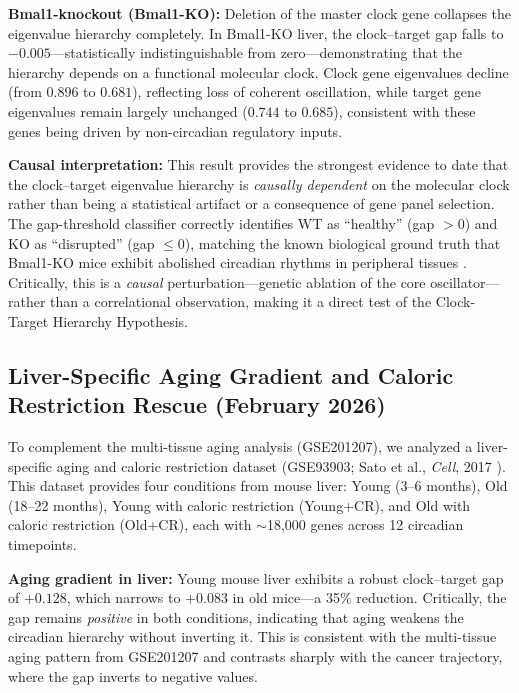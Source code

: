 \documentclass[11pt,a4paper]{article}
\begin{document}
\textbf{Bmal1-knockout (Bmal1-KO):} Deletion of the master clock gene collapses the eigenvalue hierarchy completely. In Bmal1-KO liver, the clock--target gap falls to $-0.005$---statistically indistinguishable from zero---demonstrating that the hierarchy depends on a functional molecular clock. Clock gene eigenvalues decline (from $0.896$ to $0.681$), reflecting loss of coherent oscillation, while target gene eigenvalues remain largely unchanged ($0.744$ to $0.685$), consistent with these genes being driven by non-circadian regulatory inputs.

\textbf{Causal interpretation:} This result provides the strongest evidence to date that the clock--target eigenvalue hierarchy is \textit{causally dependent} on the molecular clock rather than being a statistical artifact or a consequence of gene panel selection. The gap-threshold classifier correctly identifies WT as ``healthy'' (gap $> 0$) and KO as ``disrupted'' (gap $\leq 0$), matching the known biological ground truth that Bmal1-KO mice exhibit abolished circadian rhythms in peripheral tissues \citep{storch2007daily}. Critically, this is a \textit{causal} perturbation---genetic ablation of the core oscillator---rather than a correlational observation, making it a direct test of the Clock-Target Hierarchy Hypothesis.

\subsection{Liver-Specific Aging Gradient and Caloric Restriction Rescue (February 2026)}

To complement the multi-tissue aging analysis (GSE201207), we analyzed a liver-specific aging and caloric restriction dataset (GSE93903; Sato et al., \textit{Cell}, 2017 \citep{sato2017circadian}). This dataset provides four conditions from mouse liver: Young (3--6 months), Old (18--22 months), Young with caloric restriction (Young+CR), and Old with caloric restriction (Old+CR), each with $\sim$18,000 genes across 12 circadian timepoints.

\textbf{Aging gradient in liver:} Young mouse liver exhibits a robust clock--target gap of $+0.128$, which narrows to $+0.083$ in old mice---a 35\% reduction. Critically, the gap remains \textit{positive} in both conditions, indicating that aging weakens the circadian hierarchy without inverting it. This is consistent with the multi-tissue aging pattern from GSE201207 and contrasts sharply with the cancer trajectory, where the gap inverts to negative values.
\end{document}
